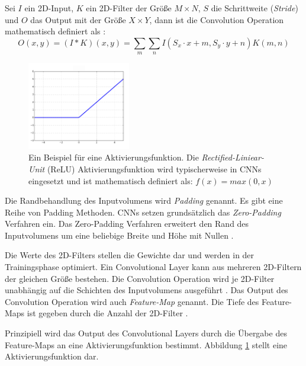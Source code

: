 Sei $I$ ein 2D-Input, $K$ ein 2D-Filter der Größe $M \times N$, $S$ die Schrittweite (\textit{Stride}) und $O$ das Output mit der Größe $X \times Y$, dann ist die Convolution Operation mathematisch definiert als \cite{goodfellowDeepLearning2016}:
\begin{equation}
	\label{eq:convolution}
	O(x,y) = (I * K)(x,y) = \sum_{m}\sum_{n}I(S_x \cdot x+m, S_y \cdot y+n)K(m,n)
\end{equation}
\begin{figure}
	\centering
	\includegraphics[width=0.4\textwidth]{images/ann_conv/ReLU.png}
	\caption{Ein Beispiel für eine Aktivierungsfunktion. Die \textit{Rectified-Liniear-Unit} (ReLU) Aktivierungsfunktion wird typischerweise in CNNs eingesetzt und ist mathematisch definiert als: $f(x) = max(0,x)$ \cite{goodfellowDeepLearning2016} }
	\label{fig:relu}
\end{figure}

Die Randbehandlung des Inputvolumens wird \textit{Padding} genannt. Es gibt eine Reihe von Padding Methoden. CNNs setzen grundsätzlich das \textit{Zero-Padding} Verfahren ein. Das Zero-Padding Verfahren erweitert den Rand des Inputvolumens um eine beliebige Breite und Höhe mit Nullen \cite{johnsonCS231nConvolutionalNeurala}. 

Die Werte des 2D-Filters stellen die Gewichte dar und werden in der Trainingsphase optimiert. Ein Convolutional Layer kann aus mehreren 2D-Filtern der gleichen Größe bestehen. Die Convolution Operation wird je 2D-Filter unabhängig auf die Schichten des Inputvolumens ausgeführt \cite{johnsonCS231nConvolutionalNeurala}. Das Output des Convolution Operation wird auch \textit{Feature-Map} genannt. Die Tiefe des Feature-Maps ist gegeben durch die Anzahl der 2D-Filter \cite{yamashitaConvolutionalNeuralNetworks2018}.

Prinzipiell wird das Output des Convolutional Layers durch die Übergabe des Feature-Maps an eine Aktivierungsfunktion bestimmt. Abbildung \ref{fig:relu} stellt eine Aktivierungsfunktion dar.

